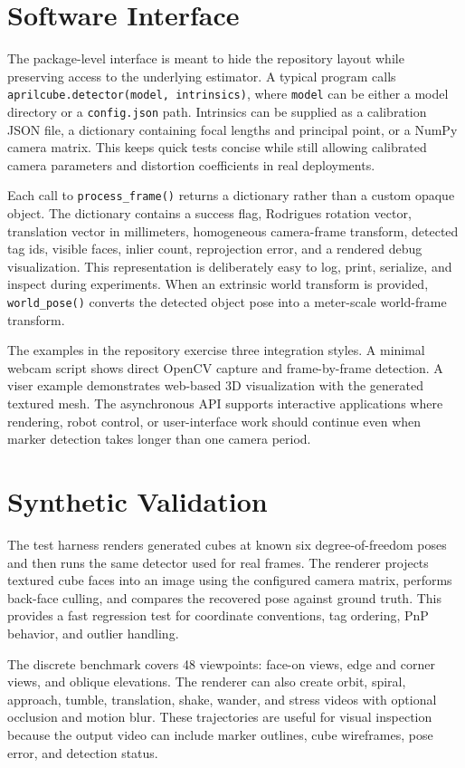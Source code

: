 \documentclass[conference]{IEEEtran}
\begin{document}
\section{Software Interface}
The package-level interface is meant to hide the repository layout while preserving access to the underlying estimator. A typical program calls \texttt{aprilcube.detector(model, intrinsics)}, where \texttt{model} can be either a model directory or a \texttt{config.json} path. Intrinsics can be supplied as a calibration JSON file, a dictionary containing focal lengths and principal point, or a NumPy camera matrix. This keeps quick tests concise while still allowing calibrated camera parameters and distortion coefficients in real deployments.

Each call to \texttt{process\_frame()} returns a dictionary rather than a custom opaque object. The dictionary contains a success flag, Rodrigues rotation vector, translation vector in millimeters, homogeneous camera-frame transform, detected tag ids, visible faces, inlier count, reprojection error, and a rendered debug visualization. This representation is deliberately easy to log, print, serialize, and inspect during experiments. When an extrinsic world transform is provided, \texttt{world\_pose()} converts the detected object pose into a meter-scale world-frame transform.

The examples in the repository exercise three integration styles. A minimal webcam script shows direct OpenCV capture and frame-by-frame detection. A viser example demonstrates web-based 3D visualization with the generated textured mesh. The asynchronous API supports interactive applications where rendering, robot control, or user-interface work should continue even when marker detection takes longer than one camera period.

\section{Synthetic Validation}
The test harness renders generated cubes at known six degree-of-freedom poses and then runs the same detector used for real frames. The renderer projects textured cube faces into an image using the configured camera matrix, performs back-face culling, and compares the recovered pose against ground truth. This provides a fast regression test for coordinate conventions, tag ordering, PnP behavior, and outlier handling.

The discrete benchmark covers 48 viewpoints: face-on views, edge and corner views, and oblique elevations. The renderer can also create orbit, spiral, approach, tumble, translation, shake, wander, and stress videos with optional occlusion and motion blur. These trajectories are useful for visual inspection because the output video can include marker outlines, cube wireframes, pose error, and detection status.
\end{document}
